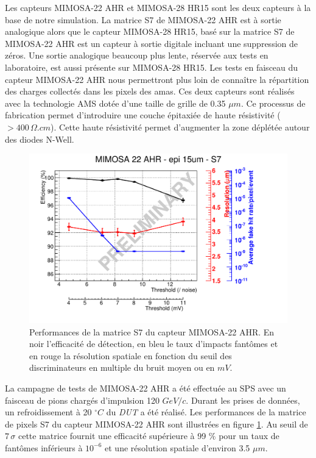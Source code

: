   Les capteurs MIMOSA-22 AHR et MIMOSA-28 HR15 sont les deux capteurs \`a la base de notre simulation. La matrice S7 de MIMOSA-22 AHR est \`a sortie analogique alors que le capteur MIMOSA-28 HR15, bas\'e sur la matrice S7 de MIMOSA-22 AHR est un capteur \`a sortie digitale incluant une suppression de z\'eros. Une sortie analogique beaucoup plus lente, r\'eserv\'ee aux tests en laboratoire, est aussi pr\'esente sur MIMOSA-28 HR15. Les tests en faisceau du capteur MIMOSA-22 AHR nous permettront plus loin de conna\^itre la r\'epartition des charges collect\'es dans les pixels des amas. Ces deux capteurs sont r\'ealis\'es avec la technologie AMS dot\'ee d'une taille de grille de 0.35 $\mu m$. Ce processus de fabrication permet d'introduire une couche \'epitaxi\'ee de haute r\'esistivit\'e ($> 400 \, \Omega.cm$). Cette haute r\'esistivit\'e permet d'augmenter la zone d\'epl\'et\'ee autour des diodes N-Well.
 
   \begin{figure}[!htb]
   \begin{center}
    \includegraphics[scale=0.60]{./figures/perf_MI22AHR-S7-eps-converted-to.pdf}
    \caption{Performances de la matrice S7 du capteur MIMOSA-22 AHR. En noir l'efficacit\'e de d\'etection, en bleu le taux d'impacts fant\^omes et en rouge la r\'esolution spatiale en fonction du seuil des discriminateurs en multiple du bruit moyen ou en $mV$.}
    \label{fig:Mi22AHR}
   \end{center}
  \end{figure}
  
   La campagne de tests de MIMOSA-22 AHR a \'et\'e effectu\'ee au SPS avec un faisceau de pions charg\'es d'impulsion 120 $GeV/c$. Durant les prises de donn\'ees, un refroidissement \`a 20 \ensuremath{^\circ C} du \textit{DUT} a \'et\'e r\'ealis\'e. Les performances de la matrice de pixels S7 du capteur MIMOSA-22 AHR sont illustr\'ees en figure \ref{fig:Mi22AHR}. Au seuil de $7 \, \sigma$ cette matrice fournit une efficacit\'e sup\'erieure \`a 99 $\%$ pour un taux de fant\^omes inférieurs \`a $10^{-6}$ et une r\'esolution spatiale d'environ 3.5 $\mu m$.
 
